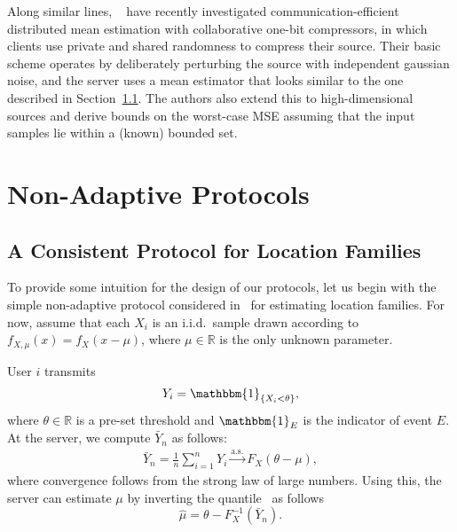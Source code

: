 \documentclass[10pt]{article} %
\theoremstyle{plain}
\theoremstyle{definition}
\theoremstyle{remark}
\newcommand{\bR}{\mathbb R}
\newcommand{\as}{\text{a.s.}}
\newcommand{\bbm}[1]{\mathbbm{#1}}
\begin{document}
Along similar lines, ~\cite{vardhan2025collaborative} have recently  
investigated communication-efficient distributed mean estimation with collaborative one-bit compressors, in which clients use private and shared randomness to compress their source. 
Their basic scheme operates by deliberately perturbing the source with independent gaussian noise, and the server uses a mean estimator that looks similar to the one described in Section~\ref{consistentestimation}. The authors also extend this to high-dimensional sources and derive bounds on the worst-case MSE assuming that the input samples lie within a (known) bounded set. 








\section{Non-Adaptive Protocols}\label{sec:nonadaptivescheme}

\subsection{A Consistent Protocol for Location Families}\label{consistentestimation}
 To provide some intuition for the design of our protocols, let us begin with the simple non-adaptive protocol considered in~\citep{kipnis2022mean} for estimating location families. For now, assume that each $X_i$ is an i.i.d.\ sample drawn according to $f_{X,\mu}(x)=f_X(x-\mu)$, where $\mu\in\mathbb{R}$ is the only unknown parameter. 

 User $i$ transmits 
\begin{align*}
    Y_i = \bbm{1}_{\{X_i < \theta\}},
\end{align*}
where \( \theta\in\bR \) is a pre-set threshold and $\bbm{1}_E$ is the indicator of event $E$. At the server, we compute \( \bar{Y}_n\) as follows:
\begin{align}
\bar{Y}_n = \frac{1}{n} \sum_{i=1}^{n} Y_i \xrightarrow{\as} F_{X}(\theta - \mu), \label{empmeanofbarY}
\end{align}
where convergence follows from the strong law of large numbers.  Using this, the server can estimate $\mu$ by inverting the quantile~\citep{kipnis2022mean,lehmann2006theory} as follows
\[
\hat{\mu} = \theta - F^{-1}_{X}(\bar{Y}_n).
\]
\end{document}
